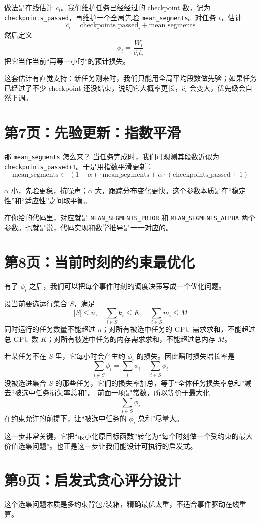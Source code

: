 \documentclass[12pt]{article}
\begin{document}
做法是在线估计 $c_i$。我们维护任务已经经过的 checkpoint 数，记为 \texttt{checkpoints\_passed}，再维护一个全局先验 \texttt{mean\_segments}。对任务 $i$，估计
\[
\hat c_i=\text{checkpoints\_passed}_i+\text{mean\_segments}
\]
然后定义
\[
\phi_i=\frac{W_i}{\hat c_i t_i}
\]
把它当作当前“再等一小时”的预计损失。

这套估计有直觉支持：新任务刚来时，我们只能用全局平均段数做先验；如果任务已经过了不少 checkpoint 还没结束，说明它大概率更长，$\hat c_i$ 会变大，优先级会自然下调。

\section*{第7页：先验更新：指数平滑}
那 \texttt{mean\_segments} 怎么来？
当任务完成时，我们可观测其段数近似为 \texttt{checkpoints\_passed+1}。于是用指数平滑更新：
\[
\text{mean\_segments}\leftarrow (1-\alpha)\cdot\text{mean\_segments}+\alpha\cdot(\text{checkpoints\_passed}+1)
\]

$\alpha$ 小，先验更稳，抗噪声；$\alpha$ 大，跟踪分布变化更快。这个参数本质是在“稳定性”和“适应性”之间取平衡。

在你给的代码里，对应就是 \texttt{MEAN\_SEGMENTS\_PRIOR} 和 \texttt{MEAN\_SEGMENTS\_ALPHA} 两个参数。也就是说，代码实现和数学推导是一一对应的。

\section*{第8页：当前时刻的约束最优化}
有了 $\phi_i$ 之后，我们可以把每个事件时刻的调度决策写成一个优化问题。

设当前要选运行集合 $S$，满足
\[
|S|\le n,\quad \sum_{i\in S}k_i\le K,\quad \sum_{i\in S}m_i\le M
\]
同时运行的任务数量不能超过 $n$；对所有被选中任务的 GPU 需求求和，不能超过总 GPU 数 $K$；对所有被选中任务的内存需求求和，不能超过总内存 $M$。

若某任务不在 $S$ 里，它每小时会产生约 $\phi_i$ 的损失。因此瞬时损失增长率是
\[
\sum_{i\notin S}\phi_i=\sum_i\phi_i-\sum_{i\in S}\phi_i
\]
没被选进集合 $S$ 的那些任务，它们的损失率加总，等于“全体任务损失率总和”减去“被选中任务损失率总和”。
前面一项是常数，所以等价于最大化
\[
\sum_{i\in S}\phi_i
\]
在约束允许的前提下，让“被选中任务的 $\phi_i$ 总和”尽量大。

这一步非常关键，它把“最小化原目标函数”转化为“每个时刻做一个受约束的最大价值选集问题”。也正是这一步让我们能设计可执行的启发式。

\section*{第9页：启发式贪心评分设计}
这个选集问题本质是多约束背包/装箱，精确最优太重，不适合事件驱动在线重算。
\end{document}
